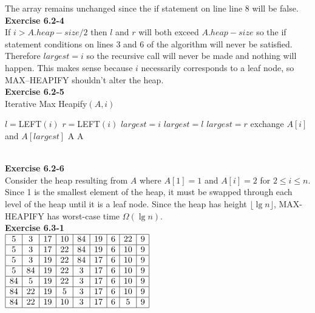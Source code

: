 \documentclass{article}
\begin{document}
The array remains unchanged since the if statement on line line 8 will be false.\\

\noindent\textbf{Exercise 6.2-4}\\

If $i > A.heap-size/2$ then $l$ and $r$ will both exceed $A.heap-size$ so the if statement conditions on lines 3 and 6 of the algorithm will never be satisfied.  Therefore $largest = i$ so the recursive call will never be made and nothing will happen. This makes sense because $i$ necessarily corresponds to a leaf node, so MAX--HEAPIFY shouldn't alter the heap. \\

\noindent\textbf{Exercise 6.2-5}\\
Iterative Max Heapify$(A,i)$
\begin{algorithm}
\begin{algorithmic}
\State $l =$LEFT$(i)$
\State $r =$LEFT$(i)$
\State $largest = i$
\State $largest =l$
\EndIf
{}
\State $largest =r$
\EndIf
{}
\State exchange $A[i]$ and $A[largest]$
\Else \Return A
\EndIf
\EndWhile
\State \Return A
\end{algorithmic}
\end{algorithm}\\


\noindent\textbf{Exercise 6.2-6}\\

Consider the heap resulting from $A$ where $A[1] = 1$ and $A[i] = 2$ for $2 \leq i \leq n$.  Since 1 is the smallest element of the heap, it must be swapped through each level of the heap until it is a leaf node.  Since the heap has height $\lfloor \lg n \rfloor$, MAX-HEAPIFY has worst-case time $\Omega(\lg n)$. \\

\noindent\textbf{Exercise 6.3-1}\\

$
\begin{array}{|c|c|c|c|c|c|c|c|c|}
\hline
5&3&17&10&84&19&6&22&9\\
\hline
5&3&17&22&84&19&6&10&9\\
\hline
5&3&19&22&84&17&6&10&9\\
\hline
5&84&19&22&3&17&6&10&9\\
\hline
84&5&19&22&3&17&6&10&9\\
\hline
84&22&19&5&3&17&6&10&9\\
\hline
84&22&19&10&3&17&6&5&9\\
\hline
\end{array}
$\\
\end{document}
